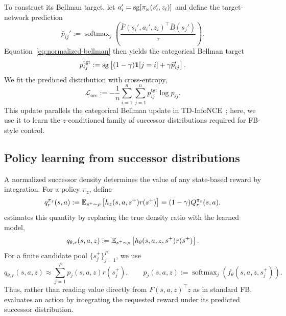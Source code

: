 To construct its Bellman target, let $a_i'=\mathrm{sg}[\pi_\omega(s_i',z_i)]$ and define the target-network prediction
\begin{equation}
    \bar p_{ij}' := \operatorname{softmax}_{j}\left(\frac{\bar F(s_i',a_i',z_i)^\top\bar B(s_j')}{\tau}\right).
    \label{eq:target-density-softmax}
\end{equation}
Equation~\eqref{eq:normalized-bellman} then yields the categorical Bellman target
\begin{equation}
    p_{ij}^{\mathrm{tgt}} := \mathrm{sg}\left[(1-\gamma)\mathbf 1[j=i]+\gamma\bar p_{ij}'\right].
    \label{eq:bellman-target}
\end{equation}
We fit the predicted distribution with cross-entropy,
\begin{equation}
    \mathcal L_{\mathrm{occ}} := -\frac{1}{n}\sum_{i=1}^{n}\sum_{j=1}^{n}p_{ij}^{\mathrm{tgt}}\log p_{ij}.
    \label{eq:occupancy-loss}
\end{equation}
This update parallels the categorical Bellman update in TD-InfoNCE~\citep{zheng-iclr24a}; here, we use it to learn the $z$-conditioned family of successor distributions required for FB-style control.

\subsection{Policy learning from successor distributions}
\label{sec:method-control}

A normalized successor density determines the value of any state-based reward by integration. 
For a policy $\pi_z$, define
\begin{equation}
    q_r^{\pi_z}(s,a) := \mathbb{E}_{s^+\sim\rho}\left[h_z(s,a,s^+)r(s^+)\right] = (1-\gamma)Q_r^{\pi_z}(s,a).
    \label{eq:normalized-value}
\end{equation}
\name{} estimates this quantity by replacing the true density ratio with the learned model,
\begin{equation}
    q_{\theta,r}(s,a,z) := \mathbb{E}_{s^+\sim\rho}\left[h_\theta(s,a,z,s^+)r(s^+)\right].
    \label{eq:reward-readout-population}
\end{equation}
For a finite candidate pool $\{s_j^+\}_{j=1}^{P}$, we use
\begin{equation}
    q_{\theta,r}(s,a,z) \approx \sum_{j=1}^{P}p_j(s,a,z)r(s_j^+), \qquad p_j(s,a,z):=\operatorname{softmax}_{j}\left(f_\theta(s,a,z,s_j^+)\right).
    \label{eq:reward-readout}
\end{equation}
Thus, rather than reading value directly from $F(s,a,z)^\top z$ as in standard FB, \name{} evaluates an action by integrating the requested reward under its predicted successor distribution.

